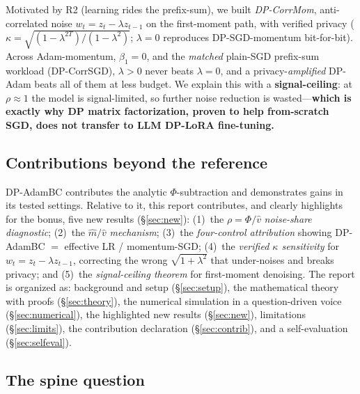 \documentclass[11pt]{article}
\theoremstyle{plain}
\theoremstyle{definition}
\theoremstyle{remark}
\begin{document}
\begin{description}[leftmargin=1.4em,itemsep=3pt,topsep=2pt]
\item[\textnormal{(R5)} Against line~4: the positive-method attempt is a unified negative.]
Motivated by R2 (learning rides the prefix-sum), we built \emph{DP-CorrMom}, anti-correlated noise
$w_t=z_t-\lambda z_{t-1}$ on the first-moment path, with verified privacy
($\kappa=\sqrt{(1-\lambda^{2T})/(1-\lambda^2)}$; $\lambda{=}0$ reproduces DP-SGD-momentum bit-for-bit).
Across Adam-momentum, $\beta_1{=}0$, and the \emph{matched} plain-SGD prefix-sum workload (DP-CorrSGD),
$\lambda{>}0$ never beats $\lambda{=}0$, and a privacy-\emph{amplified} DP-Adam beats all of them at
less budget. We explain this with a \textbf{signal-ceiling}: at $\rho\!\approx\!1$ the model is
signal-limited, so further noise reduction is wasted---\textbf{which is exactly why DP matrix
factorization, proven to help from-scratch SGD, does not transfer to LLM DP-LoRA fine-tuning.}
\end{description}

\subsection*{Contributions beyond the reference}

DP-AdamBC contributes the analytic $\Phi$-subtraction and demonstrates gains in its tested settings.
Relative to it, this report contributes, and clearly highlights for the bonus, five new results
(\S\ref{sec:new}): (1)~the $\rho=\Phi/\hat v$ \emph{noise-share diagnostic}; (2)~the $\hat m/\hat v$
\emph{mechanism}; (3)~the \emph{four-control attribution} showing DP-AdamBC $=$ effective LR /
momentum-SGD; (4)~the \emph{verified $\kappa$ sensitivity} for $w_t=z_t-\lambda z_{t-1}$, correcting
the wrong $\sqrt{1+\lambda^2}$ that under-noises and breaks privacy; and (5)~the \emph{signal-ceiling
theorem} for first-moment denoising. The report is organized as: background and setup
(\S\ref{sec:setup}), the mathematical theory with proofs (\S\ref{sec:theory}), the numerical
simulation in a question-driven voice (\S\ref{sec:numerical}), the highlighted new results
(\S\ref{sec:new}), limitations (\S\ref{sec:limits}), the contribution declaration
(\S\ref{sec:contrib}), and a self-evaluation (\S\ref{sec:selfeval}).

\subsection*{The spine question}
\label{sec:spine}
\end{document}
